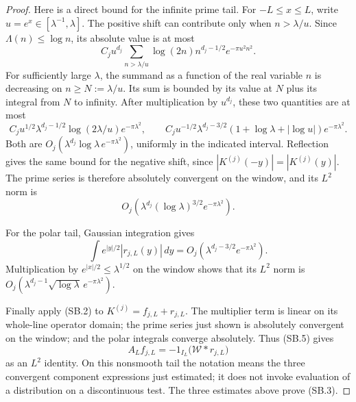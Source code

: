 \begin{proof}
Here is a direct bound for the infinite prime tail.  For
\(-L\leq x\leq L\), write \(u=e^x\in[\lambda^{-1},\lambda]\).
The positive shift can contribute only when \(n>\lambda/u\).
Since \(\Lambda(n)\leq\log n\), its absolute value is at most
\[
 C_j u^{d_j}\!
 \sum_{n>\lambda/u}\log(2n)n^{d_j-1/2}
                              e^{-\pi u^2n^2}.                \tag{SB.8}
\]
For sufficiently large \(\lambda\), the summand as a function of
the real variable \(n\) is decreasing on \(n\geq N:=\lambda/u\).
Its sum is bounded by its value at \(N\) plus its integral from
\(N\) to infinity.  After multiplication by \(u^{d_j}\), these
two quantities are at most
\[
 C_j u^{1/2}\lambda^{d_j-1/2}
                  \log(2\lambda/u)e^{-\pi\lambda^2},
 \qquad
 C_j u^{-1/2}\lambda^{d_j-3/2}
           (1+\log\lambda+|\log u|)e^{-\pi\lambda^2}.
\]
Both are \(O_j(\lambda^{d_j}\log\lambda\,e^{-\pi\lambda^2})\),
uniformly in the indicated interval.  Reflection gives the same
bound for the negative shift, since
\(|K^{(j)}(-y)|=|K^{(j)}(y)|\).
The prime series is therefore absolutely convergent on the window,
and its \(L^2\) norm is
\[
 O_j(\lambda^{d_j}(\log\lambda)^{3/2}e^{-\pi\lambda^2}).
                                                               \tag{SB.9}
\]

For the polar tail, Gaussian integration gives
\[
 \int e^{|y|/2}|r_{j,L}(y)|\,dy
     =O_j(\lambda^{d_j-3/2}e^{-\pi\lambda^2}).
\]
Multiplication by \(e^{|x|/2}\leq\lambda^{1/2}\) on the window
shows that its \(L^2\) norm is
\(O_j(\lambda^{d_j-1}\sqrt{\log\lambda}\,e^{-\pi\lambda^2})\).

Finally apply (SB.2) to \(K^{(j)}=f_{j,L}+r_{j,L}\).
The multiplier term is linear on its whole-line operator domain;
the prime series just shown is absolutely convergent on the window;
and the polar integrals converge absolutely.  Thus (SB.5) gives
\[
 A_Lf_{j,L}=-1_{I_L}\bigl(\mathcal W*r_{j,L}\bigr)
\]
as an \(L^2\) identity.  On this nonsmooth tail the notation means
the three convergent component expressions just estimated; it does
not invoke evaluation of a distribution on a discontinuous test.
The three estimates above prove (SB.3).
\end{proof}

